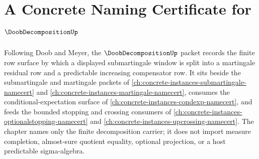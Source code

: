 \chapter{A Concrete Naming Certificate for $\DoobDecompositionUp$}
\label{ch:concrete-instances-doob-decomposition-namecert}

Following Doob and Meyer, the $\DoobDecompositionUp$ packet records the finite row surface by which a displayed submartingale window is split into a martingale residual row and a predictable increasing compensator row. It sits beside the submartingale and martingale packets of \autoref{ch:concrete-instances-submartingale-namecert} and \autoref{ch:concrete-instances-martingale-namecert}, consumes the conditional-expectation surface of \autoref{ch:concrete-instances-condexp-namecert}, and feeds the bounded stopping and crossing consumers of \autoref{ch:concrete-instances-optionalstopping-namecert} and \autoref{ch:concrete-instances-upcrossing-namecert}. The chapter names only the finite decomposition carrier; it does not import measure completion, almost-sure quotient equality, optional projection, or a host predictable sigma-algebra.

